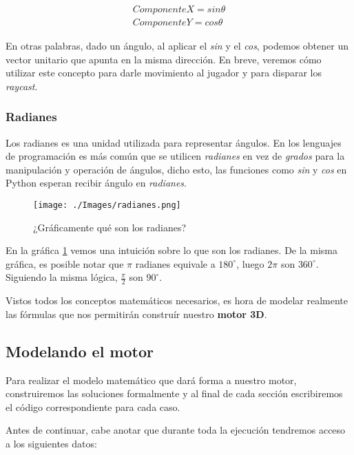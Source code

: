 \begin{equation}
\begin{aligned}
\label{unitvector}
ComponenteX = sin \theta \\
ComponenteY = cos \theta
\end{aligned}
\end{equation}

En otras palabras, dado un ángulo, al aplicar el \emph{sin} y el \emph{cos}, podemos obtener un vector unitario que apunta en la misma dirección. En breve, veremos cómo utilizar este concepto para darle movimiento al jugador y para disparar los \emph{raycast}.

\subsubsection{Radianes}

Los radianes es una unidad utilizada para representar ángulos. En los lenguajes de programación es más común que se utilicen \emph{radianes} en vez de \emph{grados} para la manipulación y operación de ángulos, dicho esto, las funciones como \emph{sin} y \emph{cos} en Python esperan recibir ángulo en \emph{radianes}. 

\begin{figure}[h!]
	\centering
	\texttt{[image: ./Images/radianes.png]}
	\caption{¿Gráficamente qué son los radianes?}
	\label{rads}
\end{figure}

En la gráfica \ref{rads} vemos una intuición sobre lo que son los radianes. De la misma gráfica, es posible notar que $\pi$ radianes equivale a $180^{\circ}
$, luego $2\pi$ son $360^{\circ}$. Siguiendo la misma lógica, $\frac{\pi}{2}$ son  $90^{\circ}$.


Vistos todos los conceptos matemáticos necesarios, es hora de modelar realmente las fórmulas que nos permitirán construír nuestro \textbf{motor 3D}.

\subsection{Modelando el motor}

Para realizar el modelo matemático que dará forma a nuestro motor, construiremos las soluciones formalmente y al final de cada sección escribiremos el código correspondiente para cada caso.

Antes de continuar, cabe anotar que durante toda la ejecución tendremos acceso a los siguientes datos:

